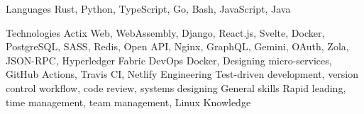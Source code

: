 
\begin{cvskills}
  \cvskill
    {Languages} %
    {Rust, Python, TypeScript, Go, Bash, JavaScript, Java} %

  \cvskill
    {Technologies} %
    {Actix Web, WebAssembly, Django, React.js, Svelte, Docker, PostgreSQL, SASS, Redis, Open API, Nginx, GraphQL, Gemini, OAuth, Zola, JSON-RPC, Hyperledger Fabric} %
  \cvskill
    {DevOps}
    {Docker, Designing micro-services, GitHub Actions, Travis CI, Netlify}
  \cvskill
    {Engineering}
    {Test-driven development, version control workflow, code review, systems designing}
  \cvskill
    {General skills}
    {Rapid leading, time management, team management, Linux Knowledge}
\end{cvskills}
